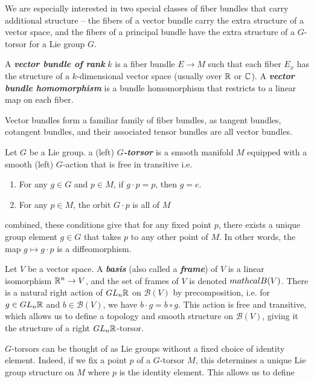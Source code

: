 \documentclass[abstract=on,twoside]{scrreprt}
\begin{document}
We are especially interested in two special classes of fiber bundles that carry
additional structure -- the fibers of a vector bundle carry the extra structure of a
vector space, and the fibers of a principal bundle have the extra structure of a
$G$-torsor for a Lie group $G$.
%
\begin{definition}
A \textbf{\textit{vector bundle of rank}} $k$ is a fiber bundle $E \to M$ such that each
fiber $E_x$ has the structure of a $k$-dimensional vector space (usually over $\mathbb{R}$ or
$\mathbb{C}$). A \textbf{\textit{vector bundle homomorphism}} is a bundle homomorphism that
restricts to a linear map on each fiber.
\end{definition}
%
Vector bundles form a familiar family of fiber bundles, as tangent bundles,
cotangent bundles, and their associated tensor bundles are all vector bundles.
%
\begin{definition}
Let $G$ be a Lie group. a (left) \textbf{\textit{$G$-torsor}} is a smooth manifold $M$
equipped with a smooth (left) $G$-action that is free in transitive i.e.
\begin{enumerate}
	\item For any $g \in G$ and $p \in M$, if $g\cdot p = p$, then $g = e$.
	\item For any $p \in M$, the orbit $G \cdot p$ is all of $M$
\end{enumerate}
combined, these conditions give that for any fixed point $p$, there exists a unique
group element $g \in G$ that takes $p$ to any other point of $M$. In other words,
the map $g \mapsto g \cdot p$ is a diffeomorphism.
\end{definition}
%
\begin{example}
Let $V$ be a vector space. A \textbf{\textit{basis}} (also called a
\textbf{\textit{frame}}) of $V$ is a linear isomorphism $\mathbb{R}^n \to V$, and the
set of frames of $V$ is denoted $\\mathcal{B}(V)$. There is a
natural right action of $GL_n\mathbb{R}$ on $\mathcal{B}(V)$ by precomposition, i.e.
for $g \in GL_n\mathbb{R}$ and $b \in \mathcal{B}(V)$, we have $b \cdot g = b \circ g$.
This action is free and transitive, which allows us to define a topology and
smooth structure on $\mathcal{B}(V)$, giving it the structure of a
right $GL_n\mathbb{R}$-torsor.
\end{example}
%
$G$-torsors can be thought of as Lie groups without a fixed choice of identity element.
Indeed, if we fix a point $p$ of a $G$-torsor $M$, this determines a unique Lie group
structure on $M$ where $p$ is the identity element. This allows us to define
\end{document}
